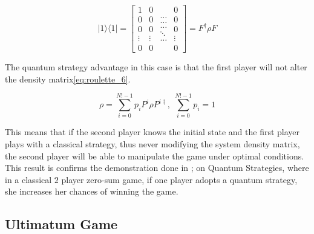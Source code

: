 \begin{equation}
\label{eq:roulette_5}
\vert1\rangle\langle1\vert=\left[\begin{array}{c}
1\\
0\\
0\\
\vdots\\
0
\end{array}\begin{array}{c}
0\\
0\\
0\\
\vdots\\
0
\end{array}\begin{array}{c}
\ldots\\
\ldots\\
\ldots\\
\ddots\\
\ldots
\end{array}\begin{array}{c}
0\\
0\\
0\\
\vdots\\
0
\end{array}\right]=F^{\dagger}\rho F
\end{equation}


The quantum strategy advantage in this case is that the first player
will not alter the density matrix\ref{eq:roulette_6}.

\begin{equation}
\label{eq:roulette_6}
\rho=\sum_{i=0}^{N!-1}p_{i}P^{i}\rho P^{i\dagger},\;\sum_{i=0}^{N!-1}p_{i}=1
\end{equation}

This means that if the second player knows the initial state and the first player plays with a classical strategy, thus never modifying the system density matrix, the second player will be able to manipulate the game under optimal conditions. This result is confirms the demonstration done in \cite{Meyer1999}; on Quantum Strategies, where in a classical $2$ player zero-sum game, if one player adopts a quantum strategy, she increases her chances of winning the game.

\clearpage


\subsection{Ultimatum Game}
\label{subsec:ultimatumquantum}






